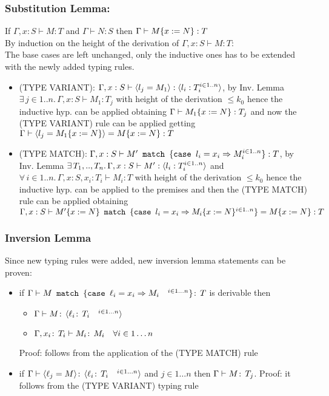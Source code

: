 \subsubsection*{Substitution Lemma:}

If \(\Gamma, x: S \vdash M: T\) and \(\Gamma \vdash N: S\) then
\(\Gamma \vdash M\{x:=N\}: T\)\\ By induction on the height of the
derivation of \(\Gamma, x: S \vdash M: T\):\\ The base cases are left
unchanged, only the inductive ones has to be extended with the newly
added typing rules.
\begin{itemize}
\item (TYPE VARIANT): \(\Gamma, x: S \vdash \langle l_j = M_1 \rangle:
  \langle l_i: T_i^{i \in 1..n} \rangle\), by Inv. Lemma \(\exists\, j \in
  1..n.\, \Gamma, x: S \vdash M_1: T_j\) with height of the derivation
  \(\le k_0\) hence the inductive hyp. can be applied obtaining
  \(\Gamma \vdash M_1\{x:=N\}: T_j\) and now the (TYPE VARIANT)
  rule can be applied getting \(\Gamma \vdash \langle l_j =
    M_1\{x:=N\} \rangle = M\{x:=N\} : T\)
\item (TYPE MATCH): \(\Gamma, x: S \vdash
  M'\texttt{ match }\{\texttt{case }l_i = x_i \Rightarrow M_i^{i \in 1..n}\}: T\), by Inv. Lemma
  \(\exists\, T_1,..,T_n.\, \Gamma, x: S \vdash M': \langle l_i: T_i^{i
      \in 1..n} \rangle\) and \(\forall\, i \in 1..n.\, \Gamma, x: S, x_i:
  T_i \vdash M_i: T\) with height of the derivation \(\le k_0\) hence
  the inductive hyp. can be applied to the premises and then the (TYPE
  MATCH) rule can be applied obtaining \(\Gamma, x: S \vdash
  M'\{x:=N\}\texttt{ match }\{\texttt{case }l_i = x_i \Rightarrow M_i\{x:=N\}^{i \in
        1..n}\} = M\{x:=N\}: T\)
\end{itemize}

\subsubsection*{Inversion Lemma}
Since new typing rules were added, new inversion lemma statements can
be proven:
\begin{itemize}
\item if \(\Gamma\vdash M\texttt{ match }\{\texttt{case }\ell_i = x_i \Rightarrow M_i\quad^{i\in
    1\dots n}\}\!:\,T\) is derivable then
  \begin{itemize}
  \item \(\Gamma\vdash M \!:\,\langle \ell_i \!:\,T_i \quad^{i\in 1
        \dots n} \rangle\)
  \item \(\Gamma, x_i\!:\,T_i \vdash M_i \!:\,M_i\quad \forall
    i\in 1\dots n\)
  \end{itemize}
  Proof: follows from the application of the (TYPE MATCH) rule
\item if \(\Gamma \vdash \langle \ell_j = M \rangle \!:\,\langle \ell_i \!:\,T_i
    \quad^{i\in 1\dots n} \rangle\) and \(j\in 1\dots n\) then
  \(\Gamma\vdash M\!:\,T_j\). Proof: it follows from the (TYPE
  VARIANT) typing rule
\end{itemize}

